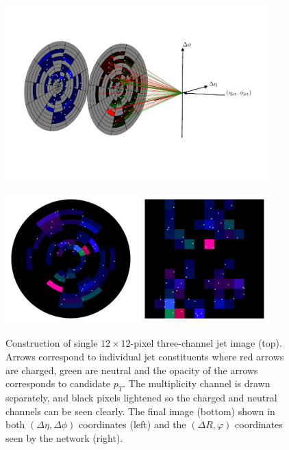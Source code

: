 \begin{figure}[h!]
    \centering
    \includegraphics[width=0.9\textwidth]{figures/event_selection/jet_diagram_RGB.pdf}
    \begin{center}
        \includegraphics[width=0.45\textwidth]{figures/event_selection/full_image_polar.pdf}
        \includegraphics[width=0.45\textwidth]{figures/event_selection/full_image_rect.pdf}
    \end{center}
    \caption{Construction of single $12\times{}12$-pixel three-channel jet image (top). 
             Arrows correspond to individual jet constituents where red arrows are charged, green are neutral and the opacity of the arrows corresponds to candidate $p_{T}$.
             The multiplicity channel is drawn separately, and black pixels lightened so the charged and neutral channels can be seen clearly.
             The final image (bottom) shown in both $(\Delta\eta,\Delta\phi)$ coordinates (left) and the $(\Delta{R},\varphi)$ coordinates seen by the network (right).}
    \label{fig:event_categorisation:jet_image}
\end{figure}

